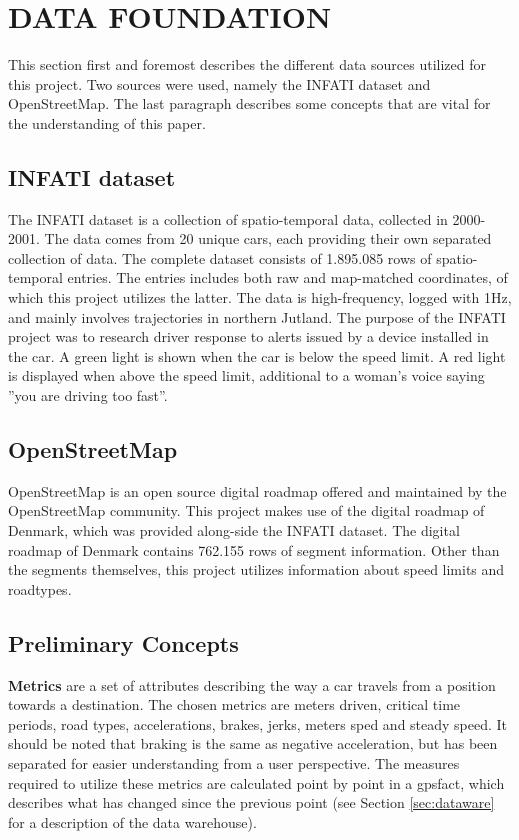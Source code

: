 \section{DATA FOUNDATION}\label{sec:datafound}

This section first and foremost describes the different data sources utilized for this project. Two sources were used, namely the INFATI dataset and OpenStreetMap. The last paragraph describes some concepts that are vital for the understanding of this paper. 

\subsection{INFATI dataset}
The INFATI dataset\cite{art:INFATI} is a collection of spatio-temporal data, collected in 2000-2001. The data comes from 20 unique cars, each providing their own separated collection of data. The complete dataset consists of 1.895.085 rows of spatio-temporal entries. The entries includes both raw and map-matched coordinates, of which this project utilizes the latter. The data is high-frequency, logged with 1Hz, and mainly involves trajectories in northern Jutland. The purpose of the INFATI\cite{art:INFATI} project was to research driver response to alerts issued by a device installed in the car. A green light is shown when the car is below the speed limit. A red light is displayed when above the speed limit, additional to a woman's voice saying ''you are driving too fast''.

\subsection{OpenStreetMap}
OpenStreetMap\cite{osm} is an open source digital roadmap offered and maintained by the OpenStreetMap community. This project makes use of the digital roadmap of Denmark, which was provided along-side the INFATI dataset\cite{art:INFATI}. The digital roadmap of Denmark contains 762.155 rows of segment information. Other than the segments themselves, this project utilizes information about speed limits and roadtypes.

\subsection{Preliminary Concepts}\label{subsec:precon}
\textbf{Metrics} are a set of attributes describing the way a car travels from a position towards a destination. The chosen metrics are meters driven, critical time periods, road types, accelerations, brakes, jerks, meters sped and steady speed. It should be noted that braking is the same as negative acceleration, but has been separated for easier understanding from a user perspective. The measures required to utilize these metrics are calculated point by point in a gpsfact, which describes what has changed since the previous point (see Section \ref{sec:dataware} for a description of the data warehouse).

